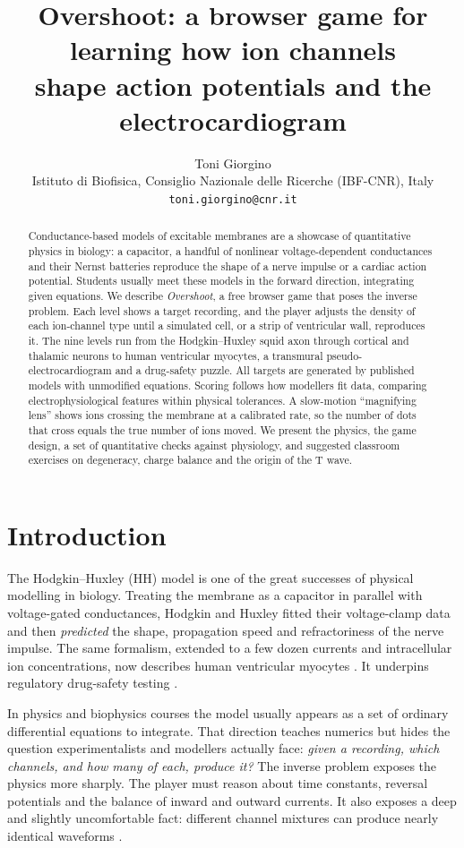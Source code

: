\documentclass[11pt,a4paper]{article}
\title{Overshoot: a browser game for learning how ion channels\\ shape action potentials and the electrocardiogram}
\author{Toni Giorgino\\[2pt]
\small Istituto di Biofisica, Consiglio Nazionale delle Ricerche (IBF-CNR), Italy\\
\small \texttt{toni.giorgino@cnr.it}}
\date{}
\begin{document}
\maketitle

\begin{abstract}
\noindent Conductance-based models of excitable membranes are a showcase of quantitative physics in biology: a capacitor, a handful of nonlinear voltage-dependent conductances and their Nernst batteries reproduce the shape of a nerve impulse or a cardiac action potential. Students usually meet these models in the forward direction, integrating given equations. We describe \emph{Overshoot}, a free browser game that poses the inverse problem. Each level shows a target recording, and the player adjusts the density of each ion-channel type until a simulated cell, or a strip of ventricular wall, reproduces it. The nine levels run from the Hodgkin--Huxley squid axon through cortical and thalamic neurons to human ventricular myocytes, a transmural pseudo-electrocardiogram and a drug-safety puzzle. All targets are generated by published models with unmodified equations. Scoring follows how modellers fit data, comparing electrophysiological features within physical tolerances. A slow-motion ``magnifying lens'' shows ions crossing the membrane at a calibrated rate, so the number of dots that cross equals the true number of ions moved. We present the physics, the game design, a set of quantitative checks against physiology, and suggested classroom exercises on degeneracy, charge balance and the origin of the T wave.
\end{abstract}

\section{Introduction}

The Hodgkin--Huxley (HH) model \cite{HH1952} is one of the great successes of physical modelling in biology. Treating the membrane as a capacitor in parallel with voltage-gated conductances, Hodgkin and Huxley fitted their voltage-clamp data and then \emph{predicted} the shape, propagation speed and refractoriness of the nerve impulse. The same formalism, extended to a few dozen currents and intracellular ion concentrations, now describes human ventricular myocytes \cite{TNNP2004,OHara2011}. It underpins regulatory drug-safety testing \cite{Colatsky2016}.

In physics and biophysics courses the model usually appears as a set of ordinary differential equations to integrate. That direction teaches numerics but hides the question experimentalists and modellers actually face: \emph{given a recording, which channels, and how many of each, produce it?} The inverse problem exposes the physics more sharply. The player must reason about time constants, reversal potentials and the balance of inward and outward currents. It also exposes a deep and slightly uncomfortable fact: different channel mixtures can produce nearly identical waveforms \cite{Prinz2004,MarderGoaillard2006}.
\end{document}
